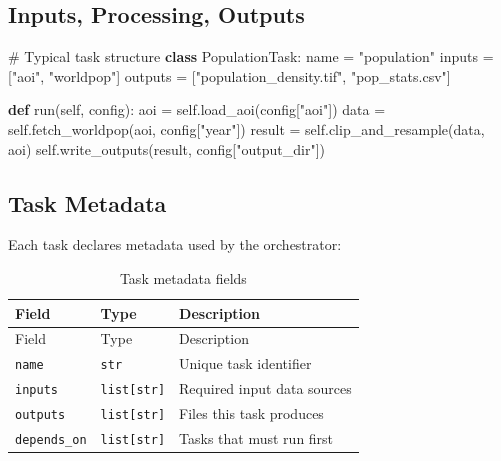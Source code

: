 \documentclass[
  letterpaper,
  DIV=11,
  numbers=noendperiod]{scrreprt}
\newenvironment{Shaded}{\begin{snugshade}}{\end{snugshade}}
\newcommand{\CommentTok}[1]{\textcolor[rgb]{0.37,0.37,0.37}{#1}}
\newcommand{\KeywordTok}[1]{\textcolor[rgb]{0.00,0.23,0.31}{\textbf{#1}}}
\newcommand{\NormalTok}[1]{\textcolor[rgb]{0.00,0.23,0.31}{#1}}
\newcommand{\OperatorTok}[1]{\textcolor[rgb]{0.37,0.37,0.37}{#1}}
\newcommand{\StringTok}[1]{\textcolor[rgb]{0.13,0.47,0.30}{#1}}
\newcommand{\VariableTok}[1]{\textcolor[rgb]{0.07,0.07,0.07}{#1}}
\begin{document}
\subsection{Inputs, Processing,
Outputs}\label{inputs-processing-outputs}

\begin{Shaded}
\begin{Highlighting}[]
\CommentTok{\# Typical task structure}
\KeywordTok{class}\NormalTok{ PopulationTask:}
\NormalTok{    name }\OperatorTok{=} \StringTok{"population"}
\NormalTok{    inputs }\OperatorTok{=}\NormalTok{ [}\StringTok{"aoi"}\NormalTok{, }\StringTok{"worldpop"}\NormalTok{]}
\NormalTok{    outputs }\OperatorTok{=}\NormalTok{ [}\StringTok{"population\_density.tif"}\NormalTok{, }\StringTok{"pop\_stats.csv"}\NormalTok{]}

    \KeywordTok{def}\NormalTok{ run(}\VariableTok{self}\NormalTok{, config):}
\NormalTok{        aoi }\OperatorTok{=} \VariableTok{self}\NormalTok{.load\_aoi(config[}\StringTok{"aoi"}\NormalTok{])}
\NormalTok{        data }\OperatorTok{=} \VariableTok{self}\NormalTok{.fetch\_worldpop(aoi, config[}\StringTok{"year"}\NormalTok{])}
\NormalTok{        result }\OperatorTok{=} \VariableTok{self}\NormalTok{.clip\_and\_resample(data, aoi)}
        \VariableTok{self}\NormalTok{.write\_outputs(result, config[}\StringTok{"output\_dir"}\NormalTok{])}
\end{Highlighting}
\end{Shaded}

\subsection{Task Metadata}\label{task-metadata}

Each task declares metadata used by the orchestrator:

\begin{longtable}[]{@{}lll@{}}
\caption{Task metadata fields}\label{tbl-task-meta}\tabularnewline
\toprule\noalign{}
Field & Type & Description \\
\midrule\noalign{}
\endfirsthead
\toprule\noalign{}
Field & Type & Description \\
\midrule\noalign{}
\endhead
\bottomrule\noalign{}
\endlastfoot
\texttt{name} & \texttt{str} & Unique task identifier \\
\texttt{inputs} & \texttt{list{[}str{]}} & Required input data
sources \\
\texttt{outputs} & \texttt{list{[}str{]}} & Files this task produces \\
\texttt{depends\_on} & \texttt{list{[}str{]}} & Tasks that must run
first \\
\end{longtable}
\end{document}
